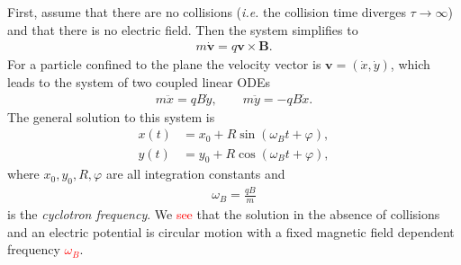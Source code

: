         \indent First, assume that there are no collisions (\textit{i.e.} the collision time diverges $\tau \rightarrow\infty$) and that there is no electric field. Then the system simplifies to
        \begin{align}
            m\dot{\bm{v}} =q \bm{v}\times \bm{B}.
        \end{align}
        For a particle confined to the plane the velocity vector is $\bm{v} = (\dot{x}, \dot{y})$, which leads to the system of two coupled linear ODEs
        \begin{align}
            m \ddot{x} = q B \dot{y}, \qquad m \ddot{y}= -q B \dot{x}.
        \end{align}
        The general solution to this system is
        \begin{align}
            x(t) &= x_0 + R \sin\left(\omega_Bt + \varphi \right), \\
            y(t) &= y_0 + R \cos\left(\omega_Bt + \varphi \right),
        \end{align}
        where $x_0, y_0, R, \varphi$ are all integration constants and
        \begin{align}
            \omega_B = \frac{q B}{m}
        \end{align}
        is the \textit{cyclotron frequency}.
        We \textcolor{red}{see} that the solution in the absence of collisions and an electric potential is circular motion with a fixed magnetic field dependent frequency \textcolor{red}{$\omega_B$}.

